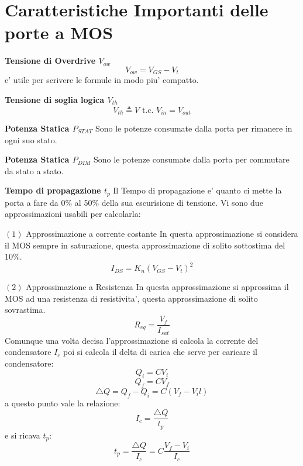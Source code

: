 \documentclass[\main/main.tex]{subfiles}
\begin{document}
\clearpage
\section{Caratteristiche Importanti delle porte a MOS}
\textbf{Tensione di Overdrive $V_{ow}$}
\[ V_{ow} = V_{GS} - V_t\]
e' utile per scrivere le formule in modo piu' compatto.

\textbf{Tensione di soglia logica $V_{th}$}
\[V_{th} \triangleq V \text{ t.c. } V_{in} = V_{out}\]

\textbf{Potenza Statica $P_{STAT}$}
Sono le potenze consumate dalla porta per rimanere in ogni suo stato.

\textbf{Potenza Statica $P_{DIM}$}
Sono le potenze consumate dalla porta per commutare da stato a stato.

\textbf{Tempo di propagazione $t_p$}
Il Tempo di propagazione e' quanto ci mette la porta a fare da 0\% al 50\% della sua escurisione di tensione.
Vi sono due approssimazioni usabili per calcolarla:

$(1)$ Approssimazione a corrente costante
In questa approssimazione si considera il MOS sempre in saturazione, questa approssimazione di solito sottostima del 10\%.
\[ I_{DS} = K_n \left( V_{GS} - V_t \right)^2\]

$(2)$ Approssimazione a Resistenza
In questa approssimazione si approssima il MOS ad una resistenza di resistivita', questa approssimazione di solito sovrastima.
\[R_{eq} = \frac{V_f}{I_{sat}} \]
Comunque una volta decisa l'approssimazione si calcola la corrente del condensatore $I_c$ poi si calcola il delta di carica che serve per caricare il condensatore:
\[Q_i = C V_i\]
\[Q_f = C V_f\]
\[\bigtriangleup Q = Q_f - Q_i = C \left( V_f - V_il\right) \]
a questo punto vale la relazione:
\[I_c = \frac{\bigtriangleup Q}{t_p}\]
e si ricava $t_p$:
\[t_p = \frac{\bigtriangleup Q}{I_c} = C \frac{V_f - V_i}{I_c}\]
\end{document}
